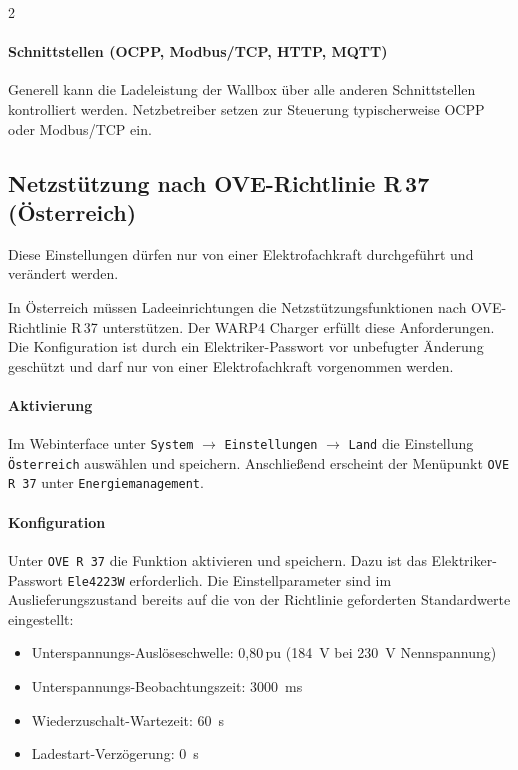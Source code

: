 \documentclass[a4paper,10pt]{article}
\newcommand{\hint}[1]{\begin{tcolorbox}[colback=boxgray,colframe=black,coltext=
white,title=Hinweis,left*=2mm,right*=2mm,boxsep=1mm,bottom=1mm,top=1mm]#1\end{tcolorbox}}
\begin{document}
\begin{multicols*}{2}
    \paragraph*{Schnittstellen (OCPP, Modbus/TCP, HTTP, MQTT)}
     Generell kann die Ladeleistung der Wallbox über alle anderen Schnittstellen
	kontrolliert werden. Netzbetreiber setzen zur Steuerung typischerweise OCPP oder Modbus/TCP ein.

    \subsection{Netzstützung nach OVE-Richtlinie \texorpdfstring{R\,37}{R 37} (Österreich)}\label{ove_r37}

	\hint{Diese Einstellungen dürfen nur von einer Elektrofachkraft durchgeführt
	und verändert werden.}

    In Österreich müssen Ladeeinrichtungen die Netzstützungsfunktionen nach
    OVE-Richtlinie R\,37 unterstützen. Der WARP4 Charger erfüllt diese
    Anforderungen. Die Konfiguration ist durch ein Elektriker-Passwort vor
    unbefugter Änderung geschützt und darf nur von einer Elektrofachkraft
    vorgenommen werden.

    \paragraph*{Aktivierung}
    Im Webinterface unter \texttt{System} $\rightarrow$ \texttt{Einstellungen} $\rightarrow$ \texttt{Land} die
    Einstellung \texttt{Österreich} auswählen und speichern. Anschließend
    erscheint der Menüpunkt \texttt{OVE R 37} unter \texttt{Energiemanagement}.

    \paragraph*{Konfiguration}
    Unter \texttt{OVE R 37} die Funktion aktivieren und speichern. Dazu ist das
    Elektriker-Passwort \texttt{Ele4223W} erforderlich. Die Einstellparameter
    sind im Auslieferungszustand bereits auf die von der Richtlinie geforderten
    Standardwerte eingestellt:
    \begin{itemize}
        \item Unterspannungs-Auslöseschwelle: 0,80\,pu (\SI{184}{\volt} bei \SI{230}{\volt} Nennspannung)
        \item Unterspannungs-Beobachtungszeit: \SI{3000}{\milli\second}
        \item Wiederzuschalt-Wartezeit: \SI{60}{\second}
        \item Ladestart-Verzögerung: \SI{0}{\second}
    \end{itemize}


\end{multicols*}
\end{document}
